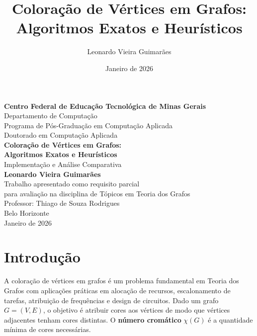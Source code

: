 \documentclass[12pt]{article}
\title{Coloração de Vértices em Grafos: Algoritmos Exatos e Heurísticos}
\author{Leonardo Vieira Guimarães}
\date{Janeiro de 2026}
\begin{document}
\onehalfspacing

\begin{titlepage}
    \centering
    \vspace*{1.5cm}
    
    {\Large \textbf{Centro Federal de Educação Tecnológica de Minas Gerais}}\\[0.5cm]
    {\large Departamento de Computação}\\[0.4cm]
    {\large Programa de Pós-Graduação em Computação Aplicada}\\[0.3cm]
    {\large Doutorado em Computação Aplicada}\\[3cm]
    
    {\LARGE \textbf{Coloração de Vértices em Grafos:}}\\[0.5cm]
    {\LARGE \textbf{Algoritmos Exatos e Heurísticos}}\\[0.8cm]
    {\large Implementação e Análise Comparativa}\\[3cm]
    
    {\large \textbf{Leonardo Vieira Guimarães}}\\[0.5cm]
    {\normalsize Trabalho apresentado como requisito parcial}\\
    {\normalsize para avaliação na disciplina de Tópicos em Teoria dos Grafos}\\[0.3cm]
    {\normalsize Professor: Thiago de Souza Rodrigues}\\[3.5cm]
    
    {\large Belo Horizonte}\\[0.3cm]
    {\large Janeiro de 2026}
    
\end{titlepage}

\newpage
\tableofcontents
\newpage

\section{Introdução}

A coloração de vértices em grafos é um problema fundamental em Teoria dos Grafos com aplicações práticas em alocação de recursos, escalonamento de tarefas, atribuição de frequências e design de circuitos. Dado um grafo $G = (V, E)$, o objetivo é atribuir cores aos vértices de modo que vértices adjacentes tenham cores distintas. O \textbf{número cromático} $\chi(G)$ é a quantidade mínima de cores necessárias.
\end{document}
